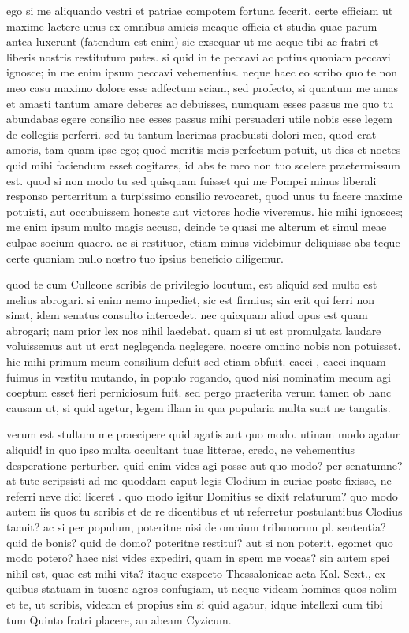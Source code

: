  ego si me aliquando vestri et patriae compotem fortuna fecerit, certe efficiam ut maxime laetere unus ex omnibus amicis meaque officia et studia quae parum antea luxerunt (fatendum est enim) sic exsequar ut me aeque tibi ac fratri et liberis nostris restitutum putes. si quid in te peccavi ac potius quoniam peccavi ignosce; in me enim ipsum peccavi vehementius. neque haec eo scribo quo te non meo casu maximo dolore esse adfectum sciam, sed profecto, si quantum me amas et amasti tantum amare deberes ac debuisses, numquam esses passus me quo tu abundabas egere consilio nec esses passus mihi persuaderi utile nobis esse legem de collegiis perferri. sed tu tantum lacrimas praebuisti dolori meo, quod erat amoris, tam quam ipse ego; quod meritis meis perfectum potuit, ut dies et noctes quid mihi faciendum esset cogitares, id abs te meo non tuo scelere praetermissum est. quod si non modo tu sed quisquam fuisset qui me Pompei minus liberali responso perterritum a turpissimo consilio revocaret, quod unus tu facere maxime potuisti, aut occubuissem honeste aut victores hodie viveremus. hic mihi ignosces; me enim ipsum multo magis accuso, deinde te quasi me alterum et simul meae culpae socium quaero. ac si restituor, etiam minus videbimur deliquisse abs teque certe quoniam nullo nostro tuo ipsius beneficio diligemur.

 quod te cum Culleone scribis de privilegio locutum, est aliquid sed multo est melius abrogari. si enim nemo impediet, sic est firmius; sin erit qui ferri non sinat, idem senatus consulto intercedet. nec quicquam aliud opus est quam abrogari; nam prior lex nos nihil laedebat. quam si ut est promulgata laudare voluissemus aut ut erat neglegenda neglegere, nocere omnino nobis non potuisset. hic mihi primum meum consilium defuit sed etiam obfuit. caeci , caeci inquam fuimus in vestitu mutando, in populo rogando, quod nisi nominatim mecum agi coeptum esset fieri perniciosum fuit. sed pergo praeterita verum tamen ob hanc causam ut, si quid agetur, legem illam in qua popularia multa sunt ne tangatis.

 verum est stultum me praecipere quid agatis aut quo modo. utinam modo agatur aliquid! in quo ipso multa occultant tuae litterae, credo, ne vehementius desperatione perturber. quid enim vides agi posse aut quo modo? per senatumne? at tute scripsisti ad me quoddam caput legis Clodium in curiae poste fixisse, ne referri neve dici liceret . quo modo igitur Domitius se dixit relaturum? quo modo autem iis quos tu scribis et de re dicentibus et ut referretur postulantibus Clodius tacuit? ac si per populum, poteritne nisi de omnium tribunorum pl. sententia? quid de bonis? quid de domo? poteritne restitui? aut si non poterit, egomet quo modo potero? haec nisi vides expediri, quam in spem me vocas? sin autem spei nihil est, quae est mihi vita? itaque exspecto Thessalonicae acta Kal. Sext., ex quibus statuam in tuosne agros confugiam, ut neque videam homines quos nolim et te, ut scribis, videam et propius sim si quid agatur, idque intellexi cum tibi tum Quinto fratri placere, an abeam Cyzicum.

